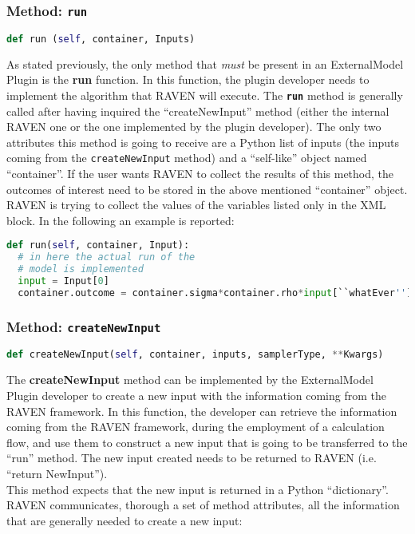 \subsubsection{Method: \texttt{run}}
\label{subsubsec:runExternalModelPlugin}
\begin{lstlisting}[language=python]
def run (self, container, Inputs)
\end{lstlisting}
As stated previously, the only method that \emph{must} be present in an
ExternalModel Plugin is the \textbf{run} function.
%
In this function, the plugin developer needs to implement the algorithm that RAVEN will
execute.
%
The \texttt{\textbf{run}} method is generally called after having inquired the
``createNewInput'' method (either the internal RAVEN one or the one implemented by
the plugin developer).
%
The only two attributes this method is going to receive are a Python list of inputs
(the inputs coming from the \texttt{createNewInput} method) and a ``self-like'' object
named ``container''.
%
If the user wants RAVEN to collect the results of this method, the outcomes of
interest need to be stored in the above mentioned ``container'' object.
%
\nb RAVEN is trying to collect the values of the variables listed only in the
 XML block.
%
In the following an example is reported:
\begin{lstlisting}[language=python]
def run(self, container, Input):
  # in here the actual run of the
  # model is implemented
  input = Input[0]
  container.outcome = container.sigma*container.rho*input[``whatEver'']
\end{lstlisting}

\subsubsection{Method: \texttt{createNewInput}}
\label{subsubsec:createNewInputExternalModelPlugin}
\begin{lstlisting}[language=python]
def createNewInput(self, container, inputs, samplerType, **Kwargs)
\end{lstlisting}

The \textbf{createNewInput} method can be implemented by the ExternalModel Plugin
developer to create a new input with the information coming from the RAVEN framework.
%
In this function, the developer can retrieve the information coming from the RAVEN
framework, during the employment of a calculation flow, and use them to
construct a new input that is going to be transferred to the ``run'' method.
%
The new input created needs to be returned to RAVEN (i.e. ``return NewInput'').
\\This method expects that the new input is returned in a Python ``dictionary''.
%
RAVEN communicates, thorough a set of method attributes, all the information
that are generally needed to create a new input:

